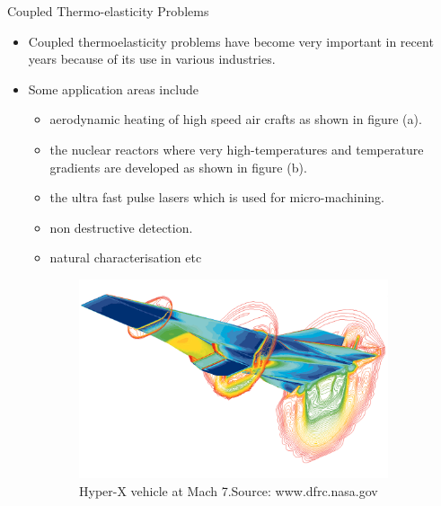 \documentclass{beamer}
\begin{document}
\begin{frame}[t,fragile]{Coupled Thermo-elasticity Problems}
    \begin{itemize}
        \item Coupled thermoelasticity problems have become very important in recent years because of its use in various industries.
        \item Some application areas include 
            \begin{itemize}
                \item aerodynamic heating of high speed air crafts as shown in figure (a). 
            \item the nuclear reactors where very high-temperatures and temperature gradients are developed as shown in figure (b).
            \item the ultra fast pulse lasers which is used for
micro-machining.
            \item non destructive detection.
            \item natural characterisation etc 
            \end{itemize}
    \end{itemize}
    \vspace{-.5cm}
    \begin{figure}[H]
      \hspace{.5cm}
\begin{subfigure}{0.45\textwidth}
  \vspace{.5cm}
    \centering
 \includegraphics[scale=.1]{hyper.jpg}
 \caption{\tiny{Hyper-X vehicle at Mach 7.Source: www.dfrc.nasa.gov}}
 \label{1}
 \end{subfigure}
 \begin{subfigure}{0.45\textwidth}

\end{subfigure}
\end{figure}
\end{frame}
\end{document}
